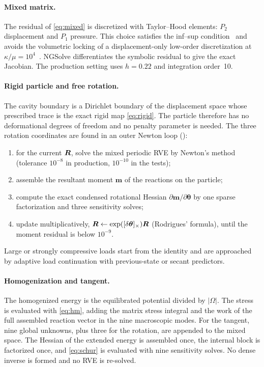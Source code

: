 \paragraph{Mixed matrix.} The residual of \cref{eq:mixed} is discretized with
Taylor--Hood elements: $P_2$ displacement and $P_1$ pressure. This choice
satisfies the inf--sup condition~\cite{Boffi2013} and avoids the volumetric locking of a
displacement-only low-order discretization at $\kappa/\mu=10^4$~\cite{Simo1985}.
NGSolve differentiates the symbolic residual to give the exact Jacobian. The
production setting uses $h=0.22$ and integration order~10.

\paragraph{Rigid particle and free rotation.} The cavity boundary is a Dirichlet
boundary of the displacement space whose prescribed trace is the exact rigid map
\cref{eq:rigid}. The particle therefore has no deformational degrees of freedom
and no penalty parameter is needed. The three rotation coordinates are found in
an outer Newton loop ():
\begin{enumerate}
  \item for the current $\bm R$, solve the mixed periodic RVE by Newton's method (tolerance $10^{-8}$ in production, $10^{-10}$ in the tests);
  \item assemble the resultant moment $\bm m$ of the reactions on the particle;
  \item compute the exact condensed rotational Hessian $\partial\bm m/\partial\bm\theta$
        by one sparse factorization and three sensitivity solves;
  \item update multiplicatively, $\bm R\leftarrow\exp([\delta\bm\theta]_\times)\bm R$
        (Rodrigues' formula), until the moment residual is below $10^{-9}$.
\end{enumerate}
Large or strongly compressive loads start from the identity and are approached
by adaptive load continuation with previous-state or secant predictors.

\paragraph{Homogenization and tangent.} The homogenized energy is the
equilibrated potential divided by $|\Omega|$. The stress is evaluated with
\cref{eq:hm}, adding the matrix stress integral and the work of the full
assembled reaction vector in the nine macroscopic modes. For the tangent, nine
global  unknowns, plus three for the rotation, are appended to
the mixed space. The Hessian of the extended energy is assembled once, the
internal block is factorized once, and \cref{eq:schur} is evaluated with nine
sensitivity solves. No dense inverse is formed and no RVE is re-solved.

